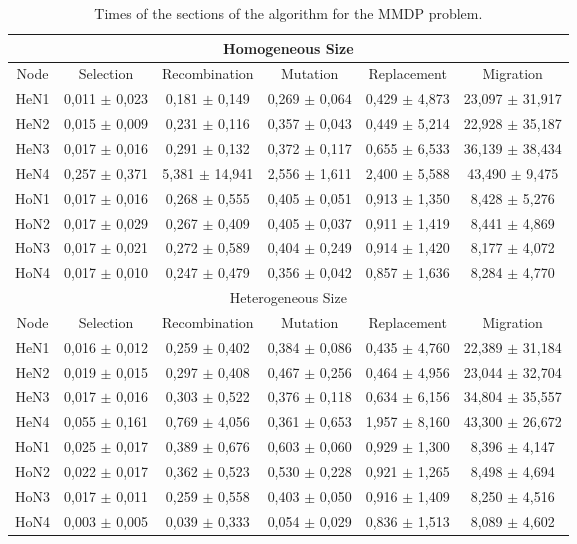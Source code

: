 \begin{table*}
\centering
\caption{Times of the sections of the algorithm for the MMDP problem.}
\begin{tabular}{|c|c|c|c|c|c|} \hline
\multicolumn{6}{|c|}{Homogeneous Size} \\ \hline
Node	& Selection		& Recombination		& Mutation		& Replacement		& Migration	        \\ \hline
HeN1	& 0,011 $\pm$ 0,023	& 0,181	$\pm$ 0,149	& 0,269	$\pm$ 0,064	& 0,429	$\pm$ 4,873	& 23,097 $\pm$ 	31,917 \\ \hline
HeN2	& 0,015	$\pm$ 0,009	& 0,231	$\pm$ 0,116	& 0,357	$\pm$ 0,043	& 0,449	$\pm$ 5,214	& 22,928 $\pm$ 	35,187 \\ \hline
HeN3	& 0,017	$\pm$ 0,016	& 0,291	$\pm$ 0,132	& 0,372	$\pm$ 0,117	& 0,655	$\pm$ 6,533	& 36,139 $\pm$ 	38,434 \\ \hline
HeN4	& 0,257	$\pm$ 0,371	& 5,381	$\pm$ 14,941	& 2,556	$\pm$ 1,611	& 2,400	$\pm$ 5,588	& 43,490 $\pm$ 	9,475 \\ \hline \hline
HoN1	& 0,017	$\pm$ 0,016	& 0,268	$\pm$ 0,555	& 0,405	$\pm$ 0,051	& 0,913	$\pm$ 1,350	& 8,428	$\pm$ 5,276 \\ \hline
HoN2	& 0,017	$\pm$ 0,029	& 0,267	$\pm$ 0,409	& 0,405	$\pm$ 0,037	& 0,911	$\pm$ 1,419	& 8,441	$\pm$ 4,869 \\ \hline
HoN3	& 0,017	$\pm$ 0,021	& 0,272	$\pm$ 0,589	& 0,404	$\pm$ 0,249	& 0,914	$\pm$ 1,420	& 8,177	$\pm$ 4,072 \\ \hline
HoN4	& 0,017	$\pm$ 0,010	& 0,247	$\pm$ 0,479	& 0,356	$\pm$ 0,042	& 0,857	$\pm$ 1,636	& 8,284	$\pm$ 4,770 \\ \hline
\multicolumn{6}{|c|}{Heterogeneous Size} \\ \hline									
Node	& Selection		& Recombination		& Mutation		& Replacement		& Migration	\\ \hline
HeN1	& 0,016	$\pm$ 0,012	& 0,259	$\pm$ 0,402	& 0,384	$\pm$ 0,086	& 0,435	$\pm$ 4,760	& 22,389 $\pm$ 	31,184 \\ \hline
HeN2	& 0,019	$\pm$ 0,015	& 0,297	$\pm$ 0,408	& 0,467	$\pm$ 0,256	& 0,464	$\pm$ 4,956	& 23,044 $\pm$ 	32,704 \\ \hline
HeN3	& 0,017	$\pm$ 0,016	& 0,303	$\pm$ 0,522	& 0,376	$\pm$ 0,118	& 0,634	$\pm$ 6,156	& 34,804 $\pm$ 	35,557 \\ \hline
HeN4	& 0,055	$\pm$ 0,161	& 0,769	$\pm$ 4,056	& 0,361	$\pm$ 0,653	& 1,957	$\pm$ 8,160	& 43,300 $\pm$ 	26,672 \\ \hline \hline
HoN1	& 0,025	$\pm$ 0,017	& 0,389	$\pm$ 0,676	& 0,603	$\pm$ 0,060	& 0,929	$\pm$ 1,300	& 8,396	$\pm$ 4,147 \\ \hline
HoN2	& 0,022	$\pm$ 0,017	& 0,362	$\pm$ 0,523	& 0,530	$\pm$ 0,228	& 0,921	$\pm$ 1,265	& 8,498	$\pm$ 4,694 \\ \hline
HoN3	& 0,017	$\pm$ 0,011	& 0,259	$\pm$ 0,558	& 0,403	$\pm$ 0,050	& 0,916	$\pm$ 1,409	& 8,250	$\pm$ 4,516 \\ \hline
HoN4	& 0,003	$\pm$ 0,005	& 0,039	$\pm$ 0,333	& 0,054	$\pm$ 0,029	& 0,836	$\pm$ 1,513	& 8,089	$\pm$ 4,602 \\ \hline
\end{tabular}
\label{tab:mmdptimes}
\end{table*}

